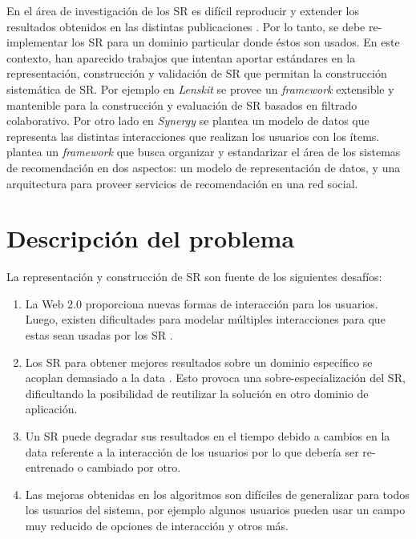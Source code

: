 En el área de investigación de los SR es difícil reproducir y extender los resultados obtenidos en las distintas publicaciones \citep{Ekstrand:2011}. Por lo tanto, se debe re-implementar los SR para un dominio particular donde éstos son usados. En este contexto, han aparecido trabajos que intentan aportar estándares en la representación, construcción y validación de SR que permitan la construcción sistemática de SR. Por ejemplo en \textit{Lenskit} \citep{Ekstrand:2011} se provee un \textit{framework} extensible y mantenible para la construcción y evaluación de SR basados en filtrado colaborativo. Por otro lado en \textit{Synergy} \citep{Babar:2010} se plantea un modelo de datos que representa las distintas interacciones que realizan los usuarios con los ítems. \cite{Palomino:2012} plantea un \textit{framework} que busca organizar y estandarizar el área de los sistemas de recomendación en dos aspectos: un modelo de representación de datos, y una arquitectura para proveer servicios de recomendación en una red social. 

\section{Descripci\'on del problema}
\label{intro:problema}


La representación y construcción de SR son fuente de los siguientes desafíos:

\begin{enumerate}
	\item La Web 2.0 proporciona nuevas formas de interacción para los usuarios. Luego, existen dificultades para modelar múltiples interacciones para que estas sean usadas por los SR \citep{Babar:2010}.
	\item Los SR para obtener mejores resultados sobre un dominio específico se acoplan demasiado a la data \citep{Babar:2010}. Esto provoca una sobre-especialización del SR, dificultando la posibilidad de reutilizar la solución en otro dominio de aplicación.
	\item Un SR puede degradar sus resultados en el tiempo debido a cambios en la data referente a la interacción  de los usuarios por lo que debería ser re-entrenado o cambiado por otro.
	\item Las mejoras obtenidas en los algoritmos son difíciles de generalizar para todos los usuarios del sistema,  por ejemplo algunos usuarios pueden usar un campo muy reducido de opciones de interacción y otros más.
\end{enumerate}


